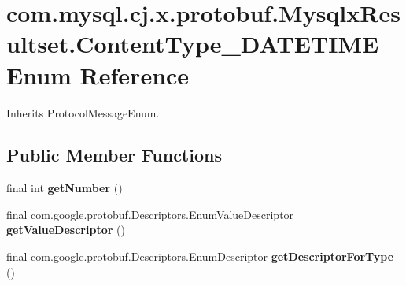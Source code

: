\hypertarget{enumcom_1_1mysql_1_1cj_1_1x_1_1protobuf_1_1_mysqlx_resultset_1_1_content_type___d_a_t_e_t_i_m_e}{}\section{com.\+mysql.\+cj.\+x.\+protobuf.\+Mysqlx\+Resultset.\+Content\+Type\+\_\+\+D\+A\+T\+E\+T\+I\+ME Enum Reference}
\label{enumcom_1_1mysql_1_1cj_1_1x_1_1protobuf_1_1_mysqlx_resultset_1_1_content_type___d_a_t_e_t_i_m_e}


Inherits Protocol\+Message\+Enum.

\subsection*{Public Member Functions}
\begin{DoxyCompactItemize}
\item 
\mbox{\label{enumcom_1_1mysql_1_1cj_1_1x_1_1protobuf_1_1_mysqlx_resultset_1_1_content_type___d_a_t_e_t_i_m_e_afc882c66b1e58a281a43c1bb674930f5}} 
final int {\bfseries get\+Number} ()
\item 
\mbox{\label{enumcom_1_1mysql_1_1cj_1_1x_1_1protobuf_1_1_mysqlx_resultset_1_1_content_type___d_a_t_e_t_i_m_e_a77ed4a2bbacc0713316d126b635426f4}} 
final com.\+google.\+protobuf.\+Descriptors.\+Enum\+Value\+Descriptor {\bfseries get\+Value\+Descriptor} ()
\item 
\mbox{\label{enumcom_1_1mysql_1_1cj_1_1x_1_1protobuf_1_1_mysqlx_resultset_1_1_content_type___d_a_t_e_t_i_m_e_abfe5181789aa2c8b6d8cffde9d02e82b}} 
final com.\+google.\+protobuf.\+Descriptors.\+Enum\+Descriptor {\bfseries get\+Descriptor\+For\+Type} ()
\end{DoxyCompactItemize}
